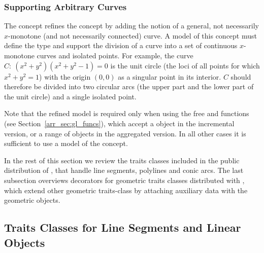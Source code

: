 \subsubsection{Supporting Arbitrary Curves
\label{arr_sssec:tr_full_concept}}

The concept  refines the
 concept by adding the notion
of a general, not necessarily $x$-monotone (and not necessarily
connected) curve. A model of this concept must define the
 type and support the division of a curve into a
set of continuous $x$-monotone curves and isolated points. For
example, the curve $C:\ (x^2 + y^2)(x^2 + y^2 - 1) = 0$ is the
unit circle (the loci of all points for which $x^2 + y^2  = 1$)
with the origin $(0,0)$ as a singular point in its interior. $C$
should therefore be divided into two circular arcs (the upper
part and the lower part of the unit circle) and a single isolated
point.

Note that the refined model  is required
only when using the free  and
 functions (see Section~\ref{arr_sec:gl_funcs}),
which accept a  object in the incremental version,
or a range of  objects in the aggregated version.
In all other cases it is sufficient to use a model of the
 concept.

In the rest of this section we review the traits classes
included in the public distribution of \cgal, that handle line
segments, polylines and conic arcs. The last subsection overviews
decorators for geometric traits classes distributed with \cgal,
which extend other geometric traits-class by attaching auxiliary
data with the geometric objects.

\subsection{Traits Classes for Line Segments and Linear Objects
\label{arr_ssec:tr_segs}}


